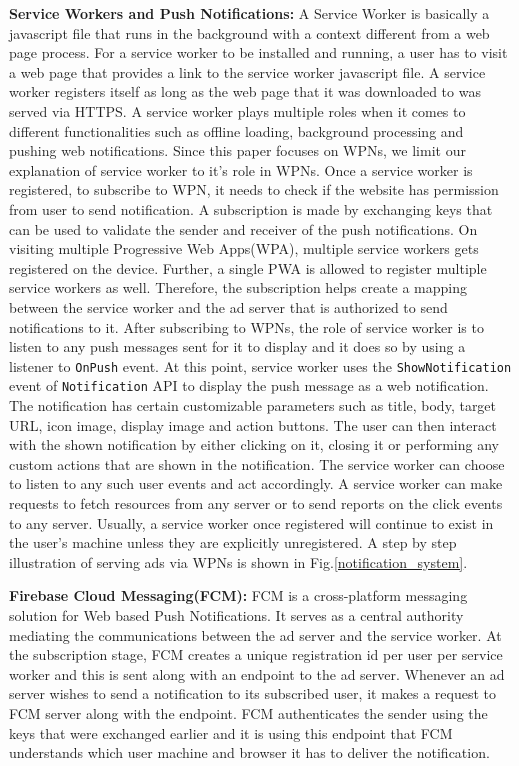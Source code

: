 \noindent \textbf{Service Workers and Push Notifications:} A Service Worker is basically a javascript file that runs in the background with a context different from a web page process. For a service worker to be installed and running, a user has to visit a web page that provides a link to the service worker javascript file. A service worker registers itself as long as the web page that it was downloaded to was served via HTTPS. A service worker plays multiple roles when it comes to different functionalities such as offline loading, background processing and pushing web notifications. Since this paper focuses on WPNs, we limit our explanation of service worker to it's role in WPNs. Once a service worker is registered, to subscribe to WPN, it needs to check if the website has permission from user to send notification. A subscription is made by exchanging keys that can be used to validate the sender and receiver of the push notifications. On visiting multiple Progressive Web Apps(WPA), multiple service workers gets registered on the device. Further, a single PWA is allowed to register multiple service workers as well. Therefore, the subscription helps create a mapping between the service worker and the ad server that is authorized to send notifications to it. After subscribing to WPNs, the role of service worker is to listen to any push messages sent for it to display and it does so by using a listener to \texttt{OnPush} event. At this point, service worker uses the \texttt{ShowNotification} event of \texttt{Notification} API to display the push message as a web notification. The notification has certain customizable parameters such as title, body, target URL, icon image, display image and action buttons. The user can then interact with the shown notification by either clicking on it, closing it or performing any custom actions that are shown in the notification. The service worker can choose to listen to any such user events and act accordingly. A service worker can make requests to fetch resources from any server or to send reports on the click events to any server. Usually, a service worker once registered will continue to exist in the user's machine unless they are explicitly unregistered. A step by step illustration of serving ads via WPNs is shown in Fig.\ref{notification_system}.   

\noindent \textbf{Firebase Cloud Messaging(FCM):} FCM is a cross-platform messaging solution for Web based Push Notifications. It serves as a central authority mediating the communications between the ad server and  the service worker. At the subscription stage, FCM creates a unique registration id per user per service worker and this is sent along with an endpoint to the ad server. Whenever an ad server wishes to send a notification to its subscribed user, it makes a request to FCM server along with the endpoint. FCM authenticates the sender using the keys that were exchanged earlier and it is using this endpoint that FCM understands which user machine and browser it has to deliver the notification.    


